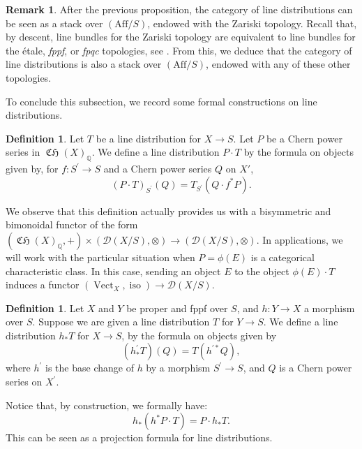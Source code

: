 \documentclass[11pt]{article}
\theoremstyle{plain}
\theoremstyle{definition}
\newtheorem{definition}[theorem]{Definition}
\newtheorem{remark}[theorem]{Remark}
\newcommand{\QBbb}{\mathbb Q}
\newcommand{\Dcal}{\mathcal D}
\newcommand{\fppf}{\emph{fppf}\xspace}
\DeclareMathOperator{\CHfrak}{\mathfrak{CH}}
\DeclareMathOperator{\iso}{iso}
\DeclareMathOperator{\Vect}{Vect}
\begin{document}
\begin{remark}
After the previous proposition, the category of line distributions can be seen as a stack over $(\mathrm{Aff}/S)$, endowed with the Zariski topology. Recall that, by descent, line bundles for the Zariski topology are equivalent to line bundles for the étale, \fppf, or \emph{fpqc} topologies, see \cite[\href{https://stacks.math.columbia.edu/tag/03P7}{03P7}]{stacks-project}. From this, we deduce that the category of line distributions is also a stack over $(\mathrm{Aff}/S)$, endowed with any of these other topologies.
\end{remark}

To conclude this subsection, we record some formal constructions on line distributions.
\begin{definition}\label{def:prod-Chern-series-line-distribution}
Let $T$ be a line distribution for $X\to S$. Let $P$ be a Chern power series in $\CHfrak(X)_{\QBbb}$. We define a line distribution $P \cdot T$ by the formula on objects given by, for $f: S^{\prime} \to S$ and a Chern power series $Q$ on $X'$,
\begin{displaymath}
(P \cdot T)_{S^{\prime}}(Q) = T_{S^{\prime}}(Q\cdot f^\ast P).
\end{displaymath}
\end{definition}
We observe that this definition actually provides us with a bisymmetric and bimonoidal functor of the form $(\CHfrak(X)_{\QBbb}, +)\times(\Dcal(X/S),\otimes) \to (\Dcal(X/S),\otimes)$. In appli\-cations, we will work with the particular situation when $P=\phi(E)$ is a categorical characteristic class. In this case, sending an object $E$ to the object $\phi(E)\cdot T$ induces a functor $(\Vect_{X},\iso)\to\Dcal(X/S)$.

\begin{definition}\label{def:direct-image-distributions}
Let $X$ and $Y$ be proper and fppf over $S$, and $h\colon Y\to X$ a morphism over $S$. Suppose we are given a line distribution $T$ for $Y\to S$. We define a line distribution $h_\ast T$ for $X\to S$, by the formula on objects given by
\begin{displaymath}
(h_\ast^{\prime} T)(Q)= T(h^{\prime\ast} Q),
\end{displaymath}
where $h^{\prime}$ is the base change of $h$ by a morphism $S^{\prime}\to S$, and $Q$ is a Chern power series on $X^{\prime}$.
\end{definition}

Notice that, by construction, we formally have:
\begin{equation}\label{linedist:projformula}
h_\ast \left( h^\ast P \cdot T \right) = P \cdot h_\ast T.
\end{equation}
This can be seen as a projection formula for line distributions.
\end{document}
